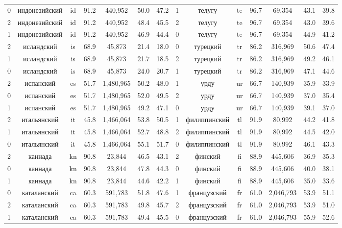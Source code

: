 \begin{table*}
{\begin{tabular}{|c|c|c|c|c|c|c|||c|c|c|c|c|c|c|}
0 & индонезийский & id & 91.2 & 440,952 & 50.0 & 47.2 & 1 & телугу & te & 96.7 & 69,354 & 43.1 & 39.8\\
2 & индонезийский & id & 91.2 & 440,952 & 48.4 & 45.5 & 2 & телугу & te & 96.7 & 69,354 & 43.0 & 39.6\\
1 & индонезийский & id & 91.2 & 440,952 & 46.9 & 44.4 & 0 & телугу & te & 96.7 & 69,354 & 44.9 & 41.2\\
2 & исландский & is & 68.9 & 45,873 & 21.4 & 18.0 & 0 & турецкий & tr & 86.2 & 316,969 & 50.6 & 47.4\\
1 & исландский & is & 68.9 & 45,873 & 21.7 & 18.5 & 2 & турецкий & tr & 86.2 & 316,969 & 49.2 & 46.1\\
0 & исландский & is & 68.9 & 45,873 & 24.0 & 20.7 & 1 & турецкий & tr & 86.2 & 316,969 & 47.1 & 44.6\\
2 & испанский & es & 51.7 & 1,480,965 & 50.2 & 48.0 & 1 & урду & ur & 66.7 & 140,939 & 35.9 & 33.9\\
0 & испанский & es & 51.7 & 1,480,965 & 52.0 & 49.5 & 2 & урду & ur & 66.7 & 140,939 & 37.0 & 35.4\\
1 & испанский & es & 51.7 & 1,480,965 & 49.2 & 47.1 & 0 & урду & ur & 66.7 & 140,939 & 39.1 & 37.0\\
2 & итальянский & it & 45.8 & 1,466,064 & 53.8 & 50.5 & 1 & филиппинский & tl & 91.9 & 80,992 & 44.2 & 41.8\\
1 & итальянский & it & 45.8 & 1,466,064 & 52.7 & 48.8 & 2 & филиппинский & tl & 91.9 & 80,992 & 44.5 & 42.0\\
0 & итальянский & it & 45.8 & 1,466,064 & 55.1 & 51.7 & 0 & филиппинский & tl & 91.9 & 80,992 & 46.1 & 43.3\\
2 & каннада & kn & 90.8 & 23,844 & 46.5 & 43.1 & 2 & финский & fi & 88.9 & 445,606 & 36.9 & 35.3\\
0 & каннада & kn & 90.8 & 23,844 & 47.8 & 44.3 & 0 & финский & fi & 88.9 & 445,606 & 40.0 & 38.1\\
1 & каннада & kn & 90.8 & 23,844 & 44.6 & 42.2 & 1 & финский & fi & 88.9 & 445,606 & 35.0 & 33.6\\
0 & каталанский & ca & 60.3 & 591,783 & 51.8 & 47.6 & 1 & французский & fr & 61.0 & 2,046,793 & 53.9 & 51.1\\
2 & каталанский & ca & 60.3 & 591,783 & 49.8 & 45.7 & 2 & французский & fr & 61.0 & 2,046,793 & 53.9 & 51.0\\
1 & каталанский & ca & 60.3 & 591,783 & 49.4 & 45.5 & 0 & французский & fr & 61.0 & 2,046,793 & 55.9 & 52.6\\

\end{tabular}}
\end{table*}
